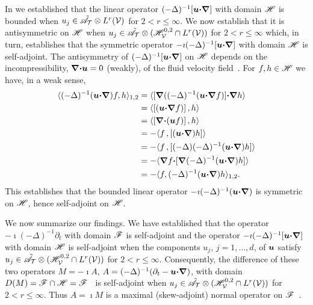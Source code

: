 \documentclass[amsa]{ipart}
\begin{document}
In  we established that the linear operator 
$(-\Delta)^{-1}[\boldsymbol{u}\mbox{\boldmath${\cdot}$}\mbox{\boldmath${\nabla}$}]$ with domain $\mathscr{H}$ is bounded when
$u_j\in\tilde{\mathscr{A}}_{\mathcal{T}}\otimes L^r(\mathcal{V})$ for $2<r\leq\infty$. We
now establish that it is antisymmetric on $\mathscr{H}$
when $u_j\in\tilde{\mathscr{A}}_{\mathcal{T}}\otimes(\mathscr{H}_{\mathcal{V}}^{0,2}\cap L^r(\mathcal{V}))$ for $2<r\leq\infty$
which, in turn, establishes that the symmetric operator
$-\imath(-\Delta)^{-1}[\boldsymbol{u}\mbox{\boldmath${\cdot}$}\mbox{\boldmath${\nabla}$}]$ with domain $\mathscr{H}$ is self-adjoint. The
antisymmetry of $(-\Delta)^{-1}[\boldsymbol{u}\mbox{\boldmath${\cdot}$}\mbox{\boldmath${\nabla}$}]$ on $\mathscr{H}$ 
depends on the incompressibility, $\mbox{\boldmath${\nabla}$}\mbox{\boldmath${\cdot}$}\boldsymbol{u}=0$ (weakly), of
the fluid velocity field~\cite{Bhattacharya:AAP:1999:951}.  For
$f,h\in\mathscr{H}$ we have, in a weak sense, 
%
\begin{align}\label{eq:Anti-sym_Sobolev}
 \langle(-\Delta)^{-1}(\vecu\bcdot\bnabla)f,h\rangle_{1,2}
       &=\langle[\bnabla((-\Delta)^{-1}(\vecu\bcdot\bnabla f)]\bcdot\bnabla h\rangle
       \\                              
       &=\langle[(\vecu\bcdot\bnabla f)]\,,h\rangle
       \notag\\
       &=\langle[\bnabla\bcdot(\vecu f)]\,,h\rangle
       \notag\\     
       &=-\langle f\,,[(\vecu\bcdot\bnabla)h]\rangle
       \notag\\
       &=-\langle f\,,[(-\Delta)(-\Delta)^{-1}(\vecu\bcdot\bnabla)h]\rangle
       \notag\\
       &=-\langle\bnabla f\bcdot[\bnabla(-\Delta)^{-1}(\vecu\bcdot\bnabla)h]\rangle
       \notag\\                              
       &= -\langle f,(-\Delta)^{-1}(\vecu\bcdot\bnabla)h\rangle_{1,2}.
       \notag
\end{align}
%
%
This establishes that the bounded linear operator
$-\imath(-\Delta)^{-1}(\boldsymbol{u}\mbox{\boldmath${\cdot}$}\mbox{\boldmath${\nabla}$})$ is symmetric on $\mathscr{H}$, hence
self-adjoint on $\mathscr{H}$.


We now summarize our findings. We have established that the
operator $-\imath(-\Delta)^{-1}\partial_t$ with domain $\mathscr{F}$ is self-adjoint and the
operator $-\imath(-\Delta)^{-1}[\boldsymbol{u}\mbox{\boldmath${\cdot}$}\mbox{\boldmath${\nabla}$}]$ with domain $\mathscr{H}$ is
self-adjoint when the components $u_j$, $j=1,\ldots,d$, of $\boldsymbol{u}$ satisfy
$u_j\in\tilde{\mathscr{A}}_{\mathcal{T}}\otimes (\mathscr{H}^{0,2}_{\mathcal{V}}\cap L^r(\mathcal{V}))$ for
$2<r\leq\infty$. Consequently, the difference of these two operators $M=-\imath A$,
 $A=(-\Delta)^{-1}(\partial_t-\boldsymbol{u}\mbox{\boldmath${\cdot}$}\mbox{\boldmath${\nabla}$})$, with domain
$D(M)=\mathscr{F}\cap\mathscr{H}=\mathscr{F}$~\cite{Stone:64} is self-adjoint when
$u_j\in\tilde{\mathscr{A}}_{\mathcal{T}}\otimes (\mathscr{H}^{0,2}_{\mathcal{V}}\cap L^r(\mathcal{V}))$ for $2<r\leq\infty$. Thus
$A=\imath M$ is a maximal (skew-adjoint) normal operator on
$\mathscr{F}$~\cite{Stone:64}.      
\end{document}
